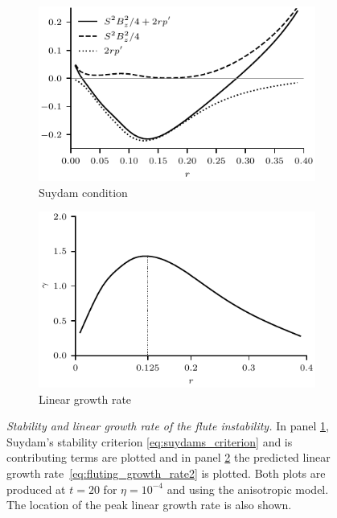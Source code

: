 \documentclass[fleqn,usenatbib]{mnras}
\newcommand{\mycaption}[2]{\caption[#1]{\emph{#1} #2}}
\begin{document}
\begin{figure}
  \centering
    \begin{subfigure}{0.49\textwidth}
      \includegraphics[width=\linewidth]{suydam_condition_4.pdf}
      \caption{Suydam condition}
      \label{fig:suydam_condition_4}
    \end{subfigure}
    \hfill
    \begin{subfigure}{0.49\textwidth}
      \includegraphics[width=\linewidth]{growth_rate_4.pdf}
      \caption{Linear growth rate}
      \label{fig:growth_rate_4}
    \end{subfigure}
\mycaption{Stability and linear growth rate of the flute
  instability.}{In panel \ref{fig:suydam_condition_4}, Suydam's stability
  criterion \eqref{eq:suydams_criterion} and is contributing
  terms   are plotted and in
  panel \ref{fig:growth_rate_4} the predicted linear growth rate~\eqref{eq:fluting_growth_rate2} is plotted. Both plots are produced at $t=20$ for $\eta=10^{-4}$ and using the anisotropic model. The location of the peak linear growth rate is also shown.}
\label{fig:stability_and_growth}%
\end{figure}
\end{document}
